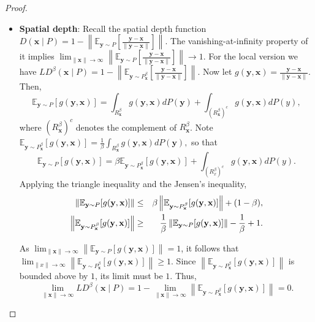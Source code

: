 \documentclass[final,3p,times]{elsarticle}
\newcommand{\vecx}{\mathbf{x}}
\newcommand{\vecy}{\mathbf{y}}
\begin{document}
\begin{proof}
\begin{itemize}
Since $h(\vecy, \vecx)$ is unbounded and center-outward monotone increasing,
$
\frac{1}{1 + h(\vecy, \vecx)} \xrightarrow[\|\vecx\| \to \infty]{\text{a.s.}} 0.
$
By the DCT,
\[
\lim_{\|\vecx\| \to \infty} \int \frac{1}{1 + h(\vecy, \vecx)}\, dP(\vecy) = \int \lim_{\|\vecx\| \to \infty} \frac{1}{1 + h(\vecy, \vecx)}\, dP(\vecy) = 0.
\]
Therefore, $
\lim_{\|\vecx\| \to \infty} D(\vecx \mid P^\beta_\vecx) = 0.
$

\item \textbf{Spatial depth}: Recall the spatial depth function $
D(\vecx \mid P) = 1 - \left\| \mathbb{E}_{\vecy \sim P} \left[ \frac{\vecy - \vecx}{\|\vecy - \vecx\|} \right] \right\|.
$ The vanishing-at-infinity property of it implies $\lim_{\|\vecx\| \to \infty}\left\|\mathbb{E}_{\vecy \sim P}\left[\frac{\vecy-\vecx}{\|\vecy-\vecx\|}\right]\right\| \to 1$. For the local version we have $
LD^\beta(\vecx \mid P) = 1 - \left\| \mathbb{E}_{\vecy\sim P^\beta_\vecx}  \left[ \frac{\vecy - \vecx}{\|\vecy - \vecx\|} \right] \right\|.
$ Now let $g(\vecy, \vecx) = \frac{\vecy - \vecx}{\|\vecy - \vecx\|}$. Then,
\[
\mathbb{E}_{\vecy \sim P}[g(\vecy, \vecx)] = \int_{R^\beta_\vecx} g(\vecy, \vecx) dP(\vecy) + \int_{(R^\beta_\vecx)^c} g(\vecy, \vecx) dP(y),
\] where $(R^\beta_\vecx)^c$ denotes the complement of $R^\beta_\vecx$. Note
$
\mathbb{E}_{\vecy\sim P^\beta_\vecx}[g(\vecy, \vecx)] = \frac{1}{\beta} \int_{R^\beta_\vecx} g(\vecy, \vecx) dP(\vecy),
$
so that
\[
\mathbb{E}_{\vecy \sim P}[g(\vecy, \vecx)] = \beta \mathbb{E}_{\vecy\sim P^\beta_\vecx}[g(\vecy, \vecx)] + \int_{(R^\beta_x)^c} g(\vecy, \vecx) dP(y).
\]
Applying the triangle inequality and the Jensen's inequality,
\begin{eqnarray}\notag
    \left\|\mathbb{E}_{\vecy \sim P}[g(\vecy, \vecx)] \right\| &\leq& \beta \left\| \mathbb{E}_{\vecy\sim P^\beta_\vecx}[g(\vecy, \vecx)] \right\| + (1-\beta),\\\notag
     \left\| \mathbb{E}_{\vecy\sim P^\beta_\vecx}[g(\vecy, \vecx)] \right\| &\geq& \frac{1}{\beta} \left\| \mathbb{E}_{\vecy\sim P}[g(\vecy, \vecx)] \right\| -\frac{1}{\beta}+1.
\end{eqnarray}

As $\lim_{\|\vecx\| \to \infty} \left\| \mathbb{E}_{\vecy \sim P}[g(\vecy, \vecx)] \right\| = 1$, it follows that
$
\lim_{\|x\|\to\infty} \left\| \mathbb{E}_{\vecy\sim P^\beta_\vecx}[g(\vecy, \vecx)] \right\| \geq 1.
$
Since $\left\| \mathbb{E}_{\vecy \sim P^\beta_{\vecx}}[g(\vecy, \vecx)] \right\|$ is bounded above by $1$, its limit must be $1$. Thus,
\[
\lim_{\|\vecx\| \to \infty} LD^\beta(\vecx \mid P) = 1- \lim_{\|\vecx\| \to \infty}\left\| \mathbb{E}_{\vecy\sim P^\beta_\vecx}[g(\vecy, \vecx)] \right\| = 0.
\]
\end{itemize}

\end{proof}
\end{document}
